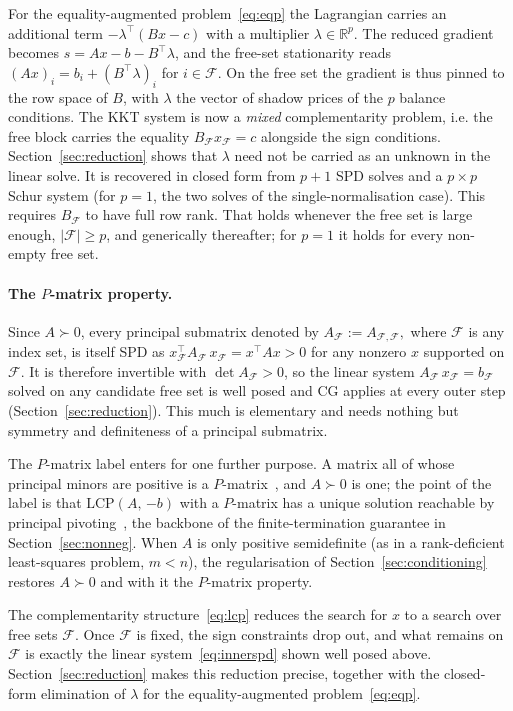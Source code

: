 For the equality-augmented problem~\eqref{eq:eqp} the Lagrangian carries an additional term
$-\lambda^\top(Bx - c)$ with a multiplier $\lambda \in \mathbb{R}^p$. The reduced gradient
becomes $s = A x - b - B^\top\lambda$, and the free-set stationarity reads
$(Ax)_i = b_i + (B^\top\lambda)_i$ for $i \in \mathcal{F}$. On the free set the gradient is
thus pinned to the row space of $B$, with $\lambda$ the vector of shadow prices of the $p$
balance conditions. The KKT system is now a \emph{mixed} complementarity problem, i.e. the free
block carries the equality $B_{\mathcal{F}}x_{\mathcal{F}} = c$ alongside the sign conditions.
Section~\ref{sec:reduction} shows that $\lambda$ need not be carried as an unknown in the
linear solve. It is recovered in closed form from $p+1$ SPD solves and a $p\times p$ Schur
system (for $p=1$, the two solves of the single-normalisation case). This requires
$B_{\mathcal{F}}$ to have full row rank. That holds whenever the free set is large enough,
$|\mathcal{F}| \geq p$, and generically thereafter; for $p=1$ it holds for every non-empty
free set.

\paragraph{The $P$-matrix property.}
Since $A \succ 0$, every principal submatrix denoted by $A_{\mathcal{F}} := A_{\mathcal{F},\mathcal{F}},$ where $\mathcal{F}$ is any index set, 
is itself SPD as $x_{\mathcal{F}}^\top A_{\mathcal{F}}\,x_{\mathcal{F}} = x^\top A x > 0$ for any
nonzero $x$ supported on $\mathcal{F}$. It is therefore invertible with
$\det A_{\mathcal{F}} > 0$, so the linear system
$A_{\mathcal{F}}\,x_{\mathcal{F}} = b_{\mathcal{F}}$ solved on any candidate free set is well
posed and CG applies at every outer step (Section~\ref{sec:reduction}). This much is
elementary and needs nothing but symmetry and definiteness of a principal submatrix.

The $P$-matrix label enters for one further purpose. A matrix all of whose principal minors
are positive is a $P$-matrix~\cite{murty1988}, and $A \succ 0$ is one; the point of the label
is that $\mathrm{LCP}(A,\,{-b})$ with a $P$-matrix has a unique solution reachable by principal
pivoting~\cite{murty1988,judice1994}, the backbone of the finite-termination guarantee in
Section~\ref{sec:nonneg}. When $A$ is only positive semidefinite (as in a rank-deficient
least-squares problem, $m < n$), the regularisation of Section~\ref{sec:conditioning} restores
$A \succ 0$ and with it the $P$-matrix property.

The complementarity structure~\eqref{eq:lcp} reduces the search for $x$ to a search over free
sets $\mathcal{F}$. Once $\mathcal{F}$ is fixed, the sign constraints drop out, and what
remains on $\mathcal{F}$ is exactly the linear system~\eqref{eq:innerspd} shown well posed
above. Section~\ref{sec:reduction} makes this reduction precise, together with the closed-form
elimination of $\lambda$ for the equality-augmented problem~\eqref{eq:eqp}.
